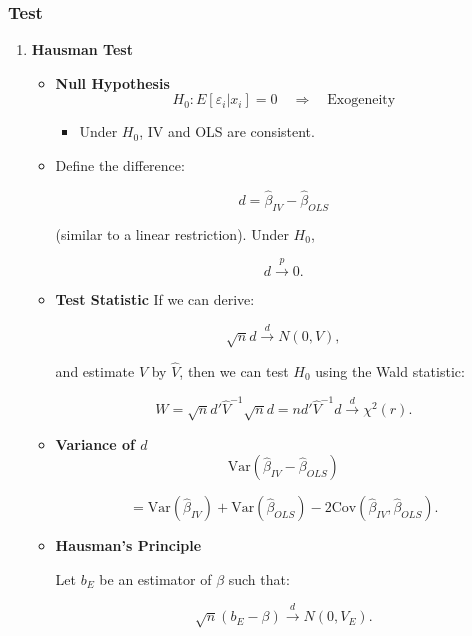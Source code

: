 \documentclass[12pt, oneside]{article}
\begin{document}
\subsubsection{Test}
\begin{enumerate}
    \item \textbf{Hausman Test}
    \begin{itemize}
        \item \textbf{Null Hypothesis}
            \[
            H_0: E[\varepsilon_i | x_i] = 0 \quad \Rightarrow \quad \text{Exogeneity}
            \]

            \begin{itemize}
                \item Under \( H_0 \), IV and OLS are consistent.
            \end{itemize}

        \item Define the difference:

            \[
            d = \hat{\beta}_{IV} - \hat{\beta}_{OLS}
            \]

            (similar to a linear restriction). Under \( H_0 \), 

            \[
            d \xrightarrow{p} 0.
            \]

        \item \textbf{Test Statistic}
            If we can derive:

            \[
            \sqrt{n} d \xrightarrow{d} N(0, V),
            \]

            and estimate \( V \) by \( \hat{V} \), then we can test \( H_0 \) using the Wald statistic:

            \[
            W = \sqrt{n} d' \hat{V}^{-1} \sqrt{n} d = n d' \hat{V}^{-1} d \xrightarrow{d} \chi^2(r).
            \]

        \item \textbf{Variance of \( d \)}
            \[
            \text{Var}(\hat{\beta}_{IV} - \hat{\beta}_{OLS})
            \]

            \[
            = \text{Var}(\hat{\beta}_{IV}) + \text{Var}(\hat{\beta}_{OLS}) - 2 \text{Cov}(\hat{\beta}_{IV}, \hat{\beta}_{OLS}).
            \]

        \item \textbf{Hausman’s Principle}

            Let \( b_E \) be an estimator of \( \beta \) such that:

            \[
            \sqrt{n} (b_E - \beta) \xrightarrow{d} N(0, V_E).
            \]


\end{itemize}
\end{enumerate}
\end{document}
